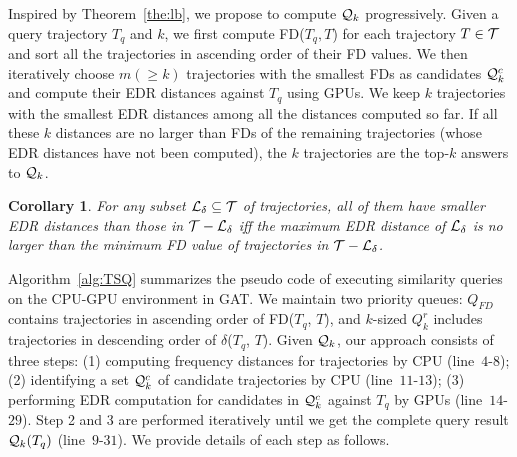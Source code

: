 \documentclass[10pt,conference,letterpaper]{IEEEtran}
\newcommand{\frname}{GAT\xspace }
\newcommand{\simq}{{{\cal Q}_k}\xspace}
\newcommand{\simcand}{{{\cal Q}_k^c}\xspace}
\newcommand{\alltraj}{{{\cal T}}\xspace}
\newcommand{\edr}{{\delta}\xspace}
\newcommand{\knownedr}{{{\cal L}_\edr}\xspace}
\newtheorem{corollary}{Corollary}
\begin{document}
Inspired by Theorem~\ref{the:lb}, we propose to compute $\simq$ progressively. Given a query trajectory $T_q$ and $k$, we first compute FD($T_q, T$) for each trajectory $T\in\alltraj$ and sort all the trajectories in ascending order of their FD values. We then iteratively choose $m (\geq k)$ trajectories with the smallest FDs as candidates $\simcand$ and compute their EDR distances against $T_q$ using GPUs. We keep $k$ trajectories with the smallest EDR distances among all the distances computed so far. If all these $k$ distances are no larger than FDs of the remaining trajectories (whose EDR distances have not been computed), the $k$ trajectories are the top-$k$ answers to $\simq$.

\begin{corollary}\label{cor:lb}
	For any subset $\knownedr\subseteq \alltraj$ of trajectories, all of them have smaller EDR distances than those in $\alltraj-\knownedr$ iff the maximum EDR distance of $\knownedr$ is no larger than the minimum FD value of trajectories in $\alltraj-\knownedr$.
\end{corollary}






Algorithm~\ref{alg:TSQ} summarizes the pseudo code of executing similarity queries on the CPU-GPU environment in \frname.
We maintain two priority queues: ${Q}_{FD}$ contains trajectories in ascending order of FD($T_q$, $T$), and $k$-sized ${Q}_{k}^r$ includes trajectories in descending order of $\edr$($T_q$, $T$).
Given $\simq$, our approach consists of three steps: (1) computing frequency distances for trajectories by CPU (line~$4$-$8$); (2) identifying a set $\simcand$ of candidate trajectories by CPU (line~$11$-$13$); (3) performing EDR computation for candidates in $\simcand$ against $T_q$ by GPUs (line~$14$-$29$). Step 2 and 3 are performed iteratively until we get the complete query result $\simq(T_q)$ (line~$9$-$31$).
We provide details of each step as follows.


\end{document}
